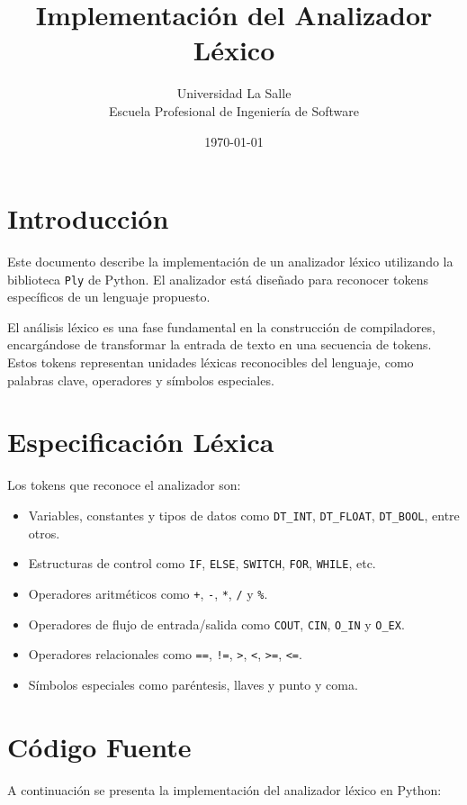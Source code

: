\documentclass[a4paper,12pt]{article}
\title{Implementación del Analizador Léxico}
\author{Universidad La Salle \\ Escuela Profesional de Ingeniería de Software}
\date{\today}
\begin{document}
\maketitle

\section{Introducción}
Este documento describe la implementación de un analizador léxico utilizando la biblioteca \texttt{Ply} de Python. El analizador está diseñado para reconocer tokens específicos de un lenguaje propuesto.

El análisis léxico es una fase fundamental en la construcción de compiladores, encargándose de transformar la entrada de texto en una secuencia de tokens. Estos tokens representan unidades léxicas reconocibles del lenguaje, como palabras clave, operadores y símbolos especiales.

\section{Especificación Léxica}
Los tokens que reconoce el analizador son:
\begin{itemize}
    \item Variables, constantes y tipos de datos como \texttt{DT\_INT}, \texttt{DT\_FLOAT}, \texttt{DT\_BOOL}, entre otros.
    \item Estructuras de control como \texttt{IF}, \texttt{ELSE}, \texttt{SWITCH}, \texttt{FOR}, \texttt{WHILE}, etc.
    \item Operadores aritméticos como \texttt{+}, \texttt{-}, \texttt{*}, \texttt{/} y \texttt{\%}.
    \item Operadores de flujo de entrada/salida como \texttt{COUT}, \texttt{CIN}, \texttt{O\_IN} y \texttt{O\_EX}.
    \item Operadores relacionales como \texttt{==}, \texttt{!=}, \texttt{>}, \texttt{<}, \texttt{>=}, \texttt{<=}.
    \item Símbolos especiales como paréntesis, llaves y punto y coma.
\end{itemize}

\section{Código Fuente}
A continuación se presenta la implementación del analizador léxico en Python:
\end{document}
